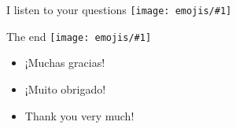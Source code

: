 \documentclass{beamer}
\newcommand{\emoji}[1]{\texttt{[image: emojis/\#1]}}
\begin{document}
\begin{frame}[fragile]{}
    \begin{center}
        \Large 
        I listen to your questions \emoji{cowboy.png}
    \end{center}
\end{frame}
\begin{frame}[fragile]{The end \emoji{angel.png}}
    \begin{itemize}
        \item ¡Muchas gracias!
        \item ¡Muito obrigado!
        \item Thank you very much!
    \end{itemize}
\end{frame}
\end{document}
